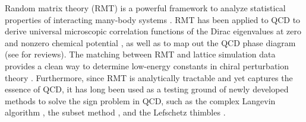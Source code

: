 \documentclass[aps,prd,longbibliography,reprint]{revtex4-2}
\newcommand{\1}{\mathbbm{1}}
\begin{document}
Random matrix theory (RMT) is a powerful framework to analyze statistical properties of interacting many-body systems \cite{Guhr:1997ve,Akemann:2011csh}. RMT has been applied to QCD to derive universal microscopic correlation functions of the Dirac eigenvalues at zero \cite{Shuryak:1992pi,Verbaarschot:1993pm,Verbaarschot:1994ia,Akemann:1996vr,Damgaard:1997ye} and nonzero chemical potential \cite{Osborn:2004rf,Akemann:2004dr,Osborn:2005ss,Akemann:2005fd,Kanazawa:2009en,Akemann:2010tv,Kanazawa:2011tt,Kanazawa:2014lga,Kanazawa:2020dju,Kanazawa:2020ktn,Kanazawa:2020fpo}, as well as to map out the QCD phase diagram \cite{Halasz:1998qr,Vanderheyden:2000ti,Pepin:2000pv,Vanderheyden:2001gx,Klein:2003fy,Klein:2004hv,Vanderheyden:2011iq} (see \cite{Verbaarschot:1997bf,Verbaarschot:2000dy,Verbaarschot:2005rj,Akemann:2007rf,Kanazawabook} for reviews). The matching between RMT and lattice simulation data provides a clean way to determine low-energy constants in chiral perturbation theory \cite{BerbenniBitsch:1997tx,Fukaya:2007fb}. Furthermore, since RMT is analytically tractable and yet captures the essence of QCD, it has long been used as a testing ground of newly developed methods to solve the sign problem in QCD, such as the complex Langevin algorithm \cite{Mollgaard:2013qra,Nagata:2016alq,Bloch:2017sex}, the subset method \cite{Bloch:2012ye}, and the Lefschetz thimbles \cite{DiRenzo:2015foa}.  
\end{document}
